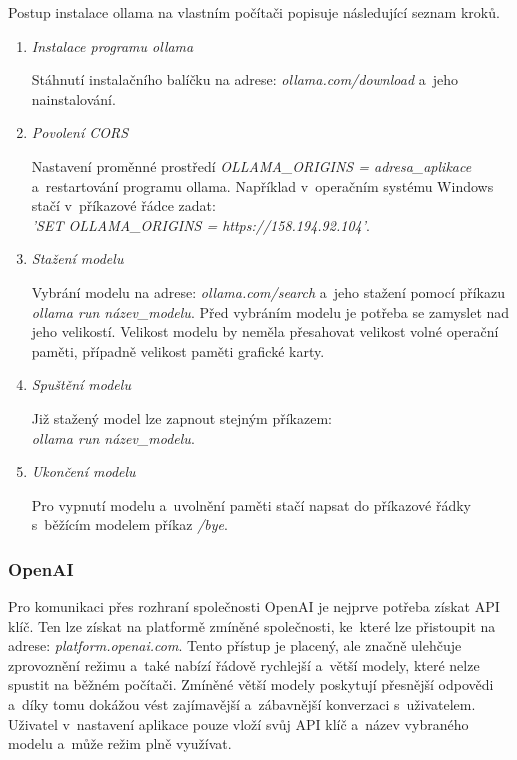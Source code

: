 \documentclass[
  master,
  program=ainfvs,
  biblatex,
  figures=true,
  tables=false,
  sourcecodes=true,
  glossaries,
  index
]{kidiplom}
\begin{document}
                Postup instalace ollama na vlastním počítači popisuje následující seznam kroků.

                \begin{enumerate}
                    \item \emph{Instalace programu ollama} \par
                        Stáhnutí instalačního balíčku na adrese: \emph{ollama.com/download} a~jeho nainstalování.
                    \item \emph{Povolení CORS} \par
                        Nastavení proměnné prostředí \emph{OLLAMA\_ORIGINS = adresa\_aplikace} a~restartování programu ollama.
                        Například v~operačním systému Windows stačí v~příkazové řádce zadat: \\\emph{'SET OLLAMA\_ORIGINS = https://158.194.92.104'}.
                        
                    \item \emph{Stažení modelu} \par
                        Vybrání modelu na adrese: \emph{ollama.com/search} a~jeho stažení pomocí příkazu \emph{ollama run název\_modelu}. 
                        Před vybráním modelu je potřeba se zamyslet nad jeho velikostí. Velikost modelu by neměla přesahovat velikost volné operační paměti, případně velikost paměti grafické karty.
                        
                    \item \emph{Spuštění modelu} \par
                        Již stažený model lze zapnout stejným příkazem: \\\emph{ollama run název\_modelu}.
                        
                    \item \emph{Ukončení modelu} \par
                        Pro vypnutí modelu a~uvolnění paměti stačí napsat do příkazové řádky s~běžícím modelem příkaz \emph{/bye}.
                \end{enumerate}

            \subsubsection{OpenAI}
                Pro komunikaci přes rozhraní společnosti OpenAI je nejprve potřeba získat API klíč. Ten lze získat na platformě zmíněné společnosti, ke~které lze přistoupit na adrese: \emph{platform.openai.com}. Tento přístup je placený, ale značně ulehčuje zprovoznění režimu a~také nabízí řádově rychlejší a~větší modely, které nelze spustit na běžném počítači. Zmíněné větší modely poskytují přesnější odpovědi a~díky tomu dokážou vést zajímavější a~zábavnější konverzaci s~uživatelem. Uživatel v~nastavení aplikace pouze vloží svůj API klíč a~název vybraného modelu a~může režim plně využívat.
        
\end{document}
